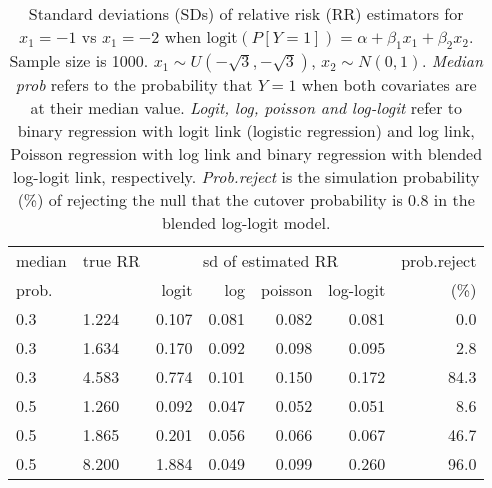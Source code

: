 \documentclass[12pt,a4paper]{article}
\begin{document}
\begin{table}[H] 
\small\sf\centering 
\caption{Standard deviations (SDs) of relative risk (RR) estimators for $x_1=-1$ vs $x_1=-2$ when $\mbox{logit}(P[Y=1])=\alpha+\beta_1 x_1 + \beta_2 x_2$. Sample size is 1000. $x_1 \sim $$U(-\sqrt{3},-\sqrt{3})$, $x_2 \sim N(0,1)$. {\it Median prob} refers to the probability that $Y=1$ when both covariates are at their median value. {\it Logit, log, poisson and log-logit} refer to binary regression with logit link (logistic regression) and log link, Poisson regression with log link and binary regression with blended log-logit link, respectively. {\it Prob.reject} is the simulation probability (\%) of rejecting the null that the cutover probability is $0.8$ in the blended log-logit model.} 
\begin{tabular}{llrrrrr} 
\toprule 
median & true RR & \multicolumn{4}{c}{sd of estimated RR} & prob.reject \\ 
prob. & & logit & log & poisson & log-logit  & (\%) \\ \midrule 
0.3 & 1.224 & 0.107 & 0.081 & 0.082 & 0.081 &  0.0 \\  
0.3 & 1.634 & 0.170 & 0.092 & 0.098 & 0.095 &  2.8 \\  
0.3 & 4.583 & 0.774 & 0.101 & 0.150 & 0.172 & 84.3 \\  
0.5 & 1.260 & 0.092 & 0.047 & 0.052 & 0.051 &  8.6 \\  
0.5 & 1.865 & 0.201 & 0.056 & 0.066 & 0.067 & 46.7 \\  
0.5 & 8.200 & 1.884 & 0.049 & 0.099 & 0.260 & 96.0 \\  
\bottomrule 
\end{tabular} 
\end{table} 
\end{document}
